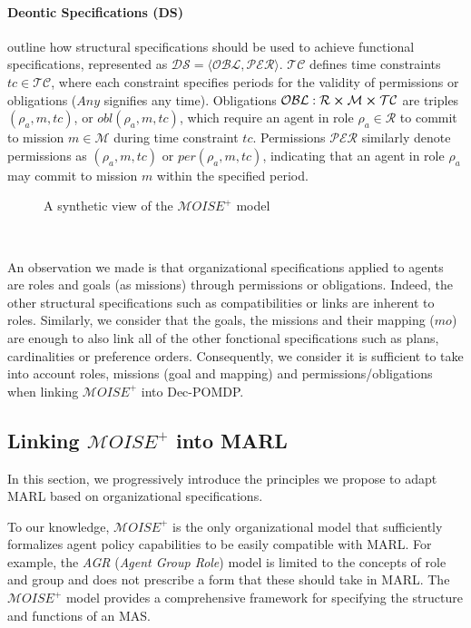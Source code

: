 \documentclass[sigconf,anonymous]{aamas}
\begin{document}
\noindent \paragraph{\textbf{Deontic Specifications (DS)}} outline how structural specifications should be used to achieve functional specifications, represented as $\mathcal{DS} = \langle \mathcal{OBL}, \mathcal{PER} \rangle$. $\mathcal{TC}$ defines time constraints $tc \in \mathcal{TC}$, where each constraint specifies periods for the validity of permissions or obligations ($Any$ signifies any time). Obligations $\mathcal{OBL}: \mathcal{R} \cross \mathcal{M} \cross \mathcal{TC}$ are triples $(\rho_a, m, tc)$, or $obl(\rho_a, m, tc)$, which require an agent in role $\rho_a \in \mathcal{R}$ to commit to mission $m \in \mathcal{M}$ during time constraint $tc$. Permissions $\mathcal{PER}$ similarly denote permissions as $(\rho_a, m, tc)$ or $per(\rho_a, m, tc)$, indicating that an agent in role $\rho_a$ may commit to mission $m$ within the specified period.

\begin{figure}[!]
    
    \caption{A synthetic view of the $\mathcal{M}OISE^+$ model}
    \label{fig:moise_model}
\end{figure}

\

An observation we made is that organizational specifications applied to agents are roles and goals (as missions) through permissions or obligations. Indeed, the other structural specifications such as compatibilities or links are inherent to roles. Similarly, we consider that the goals, the missions and their mapping ($mo$) are enough to also link all of the other fonctional specifications such as plans, cardinalities or preference orders.
Consequently, we consider it is sufficient to take into account roles, missions (goal and mapping) and permissions/obligations when linking $\mathcal{M}OISE^+$ into Dec-POMDP. 

\subsection{Linking $\mathcal{M}OISE^+$ into MARL}

In this section, we progressively introduce the principles we propose to adapt MARL based on organizational specifications.

To our knowledge, $\mathcal{M}OISE^+$ is the only organizational model that sufficiently formalizes agent policy capabilities to be easily compatible with MARL. For example, the \textit{AGR} (\textit{Agent Group Role}) model is limited to the concepts of role and group and does not prescribe a form that these should take in MARL. The $\mathcal{M}OISE^+$ model provides a comprehensive framework for specifying the structure and functions of an MAS.
\end{document}
